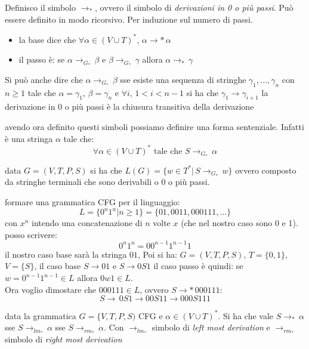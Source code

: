 \documentclass[a4paper,12pt, oneside]{book}
\begin{document}
\begin{definizione}
Definisco il simbolo $\to _*$, ovvero il simbolo di \textit{derivazioni in 0 o più passi}. Può essere definito in modo ricorsivo. Per induzione sul numero di passi.
\begin{itemize}
\item la base dice che  $\forall \alpha\in (V\cup T)^*,\, \alpha\to * \,\alpha$
\item il passo è: se $\alpha\to_{G_*} \,\beta $ e $ \beta \to_{G_*} \,\gamma$ allora $\alpha\to_* \,\gamma$
\end{itemize}
Si può anche dire che $\alpha\to_{G_*}\, \beta$ sse esiste una sequenza di stringhe $\gamma_1,...,\gamma_n$ con $n\geq 1$ tale che $\alpha=\gamma_1$, $\beta=\gamma_n$ e $\forall i,\, 1<i<n-1$ si ha che $\gamma_1\to \gamma_{i+1}$
la derivazione in 0 o più passi è la chiusura transitiva della derivazione
\end{definizione}
\begin{definizione}
avendo ora definito questi simboli possiamo definire una forma sentenziale. Infatti è una stringa $\alpha$ tale che:
$$\forall \alpha\in (V\cup T)^* \mbox{ tale che }S\to_{G_*}\, \alpha$$
\end{definizione}
\begin{definizione}
data $G=(V,T,P,S)$ si ha che $L(G)=\{w\in T^* |\, S\to_{G_*}\, w\}$ ovvero composto da stringhe terminali che sono derivabili o 0 o più passi.
\end{definizione}
\begin{esempio}
formare una grammatica CFG per il linguaggio:
$$L=\{0^n 1^n| n\geq 1\}=\{01, 0011, 000111,...\}$$
con $x^n$ intendo una concatenazione di $n$ volte $x$ (che nel nostro caso sono 0 e 1).\\
posso scrivere:
$$0^n 1^n =00^{n-1} 1^{n-1}1$$
il nostro caso base sarà la stringa $01$, Poi si ha:
$G=(V,T,P,S)$, $T=\{0,1\}$, $V=\{S\}$, il caso base $S\to 01$  e $S\to 0S1$
il caso passo è quindi: se $w= 0^{n-1}1^{n-1}\in L$ allora $0w1\in L$.\\
Ora voglio dimostare che $000111\in L$, ovvero $S\to*\, 000111$:\\
$$S\to\, 0S1 \to 00S11\to 000S111$$
\end{esempio}
\begin{teorema}
data la grammatica $G=\{V,T,P,S)$ CFG e $\alpha\in (V\cup T)^*$. Si ha che vale $S\to_*\, \alpha$ sse $S\to_{lm_*}\, \alpha$ sse $S\to_{rm_*}\, \alpha$. Con $\to_{lm_*}$ simbolo di \textit{left most derivation }e $\to_{rm_*}$ simbolo di \textit{right most derivation}
\end{teorema}
\end{document}
